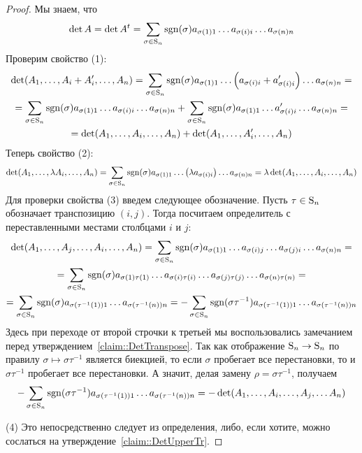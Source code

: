 \begin{proof}
Мы знаем, что 
\[
\det A = \det A^t = \sum_{\sigma\in\operatorname{S}_{n}}\operatorname{sgn}(\sigma)a_{\sigma(1)1} \ldots a_{\sigma(i)i}\ldots a_{\sigma(n)n}
\]
Проверим свойство (1):
\begin{gather*}
\det(A_1,\ldots, A_i + A_i', \ldots, A_n) = \sum_{\sigma\in\operatorname{S}_{n}}\operatorname{sgn}(\sigma)a_{\sigma(1)1} \ldots \left(a_{\sigma(i)i} + a_{\sigma(i)i}'\right)\ldots a_{\sigma(n)n}=\\
= \sum_{\sigma\in\operatorname{S}_{n}}\operatorname{sgn}(\sigma)a_{\sigma(1)1} \ldots a_{\sigma(i)i}\ldots a_{\sigma(n)n} +\sum_{\sigma\in\operatorname{S}_{n}}\operatorname{sgn}(\sigma)a_{\sigma(1)1} \ldots a_{\sigma(i)i}'\ldots a_{\sigma(n)n} =\\
= \det(A_1,\ldots, A_i, \ldots, A_n) + \det(A_1,\ldots,A_i', \ldots, A_n)
\end{gather*}
Теперь свойство (2):
\[
\det(A_1,\ldots, \lambda A_i, \ldots, A_n) = \sum_{\sigma\in\operatorname{S}_{n}}\operatorname{sgn}(\sigma)a_{\sigma(1)1} \ldots \left(\lambda a_{\sigma(i)i}\right)\ldots a_{\sigma(n)n}= \lambda \det(A_1,\ldots,  A_i, \ldots, A_n) 
\]
Для проверки свойства (3) введем следующее обозначение.
Пусть $\tau\in\operatorname{S}_{n}$ обозначает транспозицию $(i,j)$.
Тогда посчитаем определитель с переставленными местами столбцами $i$ и $j$:
\begin{gather*}
\det (A_1,\ldots, A_j, \ldots, A_i, \ldots, A_n) = \sum_{\sigma\in\operatorname{S}_{n}}\operatorname{sgn}(\sigma) a_{\sigma(1)1}\ldots a_{\sigma(i)j}\ldots a_{\sigma(j)i}\ldots a_{\sigma(n)n} = \\
=  \sum_{\sigma\in\operatorname{S}_{n}}\operatorname{sgn}(\sigma) a_{\sigma(1)\tau(1)}\ldots a_{\sigma(i)\tau(i)}\ldots a_{\sigma(j)\tau(j)}\ldots a_{\sigma(n)\tau(n)} = \\
= \sum_{\sigma\in\operatorname{S}_{n}} \operatorname{sgn}(\sigma) a_{\sigma(\tau^{-1}(1))1} \ldots a_{\sigma(\tau^{-1}(n))n} = -\sum_{\sigma\in\operatorname{S}_{n}} \operatorname{sgn}(\sigma\tau^{-1}) a_{\sigma(\tau^{-1}(1))1} \ldots a_{\sigma(\tau^{-1}(n))n}
\end{gather*}
Здесь при переходе от второй строчки к третьей мы воспользовались замечанием перед утверждением~\ref{claim::DetTranspose}.
Так как отображение $\operatorname{S}_{n}\to \operatorname{S}_{n}$ по правилу $\sigma\mapsto \sigma \tau^{-1}$ является биекцией, то если $\sigma$ пробегает все перестановки, то и $\sigma\tau^{-1}$ пробегает все перестановки.
А значит, делая замену $\rho = \sigma \tau^{-1}$, получаем
\[
-\sum_{\sigma\in\operatorname{S}_{n}} \operatorname{sgn}(\sigma\tau^{-1}) a_{\sigma(\tau^{-1}(1))1} \ldots a_{\sigma(\tau^{-1}(n))n} = -\det (A_1,\ldots, A_i, \ldots, A_j,\ldots A_n)
\]

(4) Это непосредственно следует из определения, либо, если хотите, можно сослаться на утверждение~\ref{claim::DetUpperTr}.
\end{proof}

